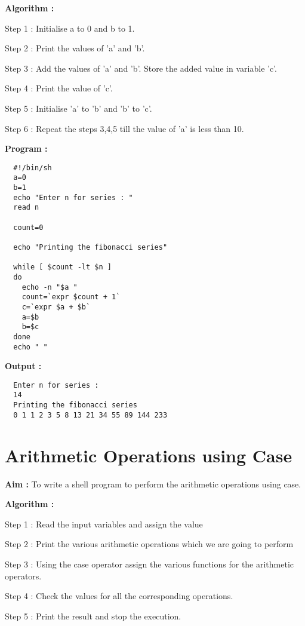 \documentclass[journal,onecolumn]{IEEEtran}
\begin{document}
\textbf{Algorithm : }
\begin{list}{}{}
  \item Step 1 : Initialise a to 0 and b to
        1.
  \item Step 2 : Print the values of 'a'
        and 'b'.
  \item Step 3 : Add the values of 'a' and 'b'. Store the added value in
        variable 'c'.
  \item Step 4 : Print the value of 'c'.
  \item Step 5 : Initialise 'a' to 'b' and 'b' to 'c'.
  \item Step 6 : Repeat the steps 3,4,5 till the value of 'a' is less than 10.
\end{list}

\textbf{Program : }
\begin{verbatim}
  #!/bin/sh
  a=0
  b=1
  echo "Enter n for series : "
  read n

  count=0

  echo "Printing the fibonacci series"

  while [ $count -lt $n ]
  do
    echo -n "$a "
    count=`expr $count + 1`
    c=`expr $a + $b`
    a=$b
    b=$c
  done
  echo " "
\end{verbatim}

\textbf{Output : }
\begin{verbatim}
  Enter n for series : 
  14
  Printing the fibonacci series
  0 1 1 2 3 5 8 13 21 34 55 89 144 233  
\end{verbatim}

\section{Arithmetic Operations using Case}
\textbf{Aim : } To write a shell program to perform the arithmetic operations using case.

\textbf{Algorithm : }
\begin{list}{}{}
  \item Step 1 : Read the input variables and assign the value
  \item Step 2 : Print the various arithmetic operations which we are going to perform
  \item Step 3 : Using the case operator assign the various functions for the arithmetic operators.
  \item Step 4 : Check the values for all the corresponding operations.
  \item Step 5 : Print the result and stop the execution.
\end{list}
\end{document}
